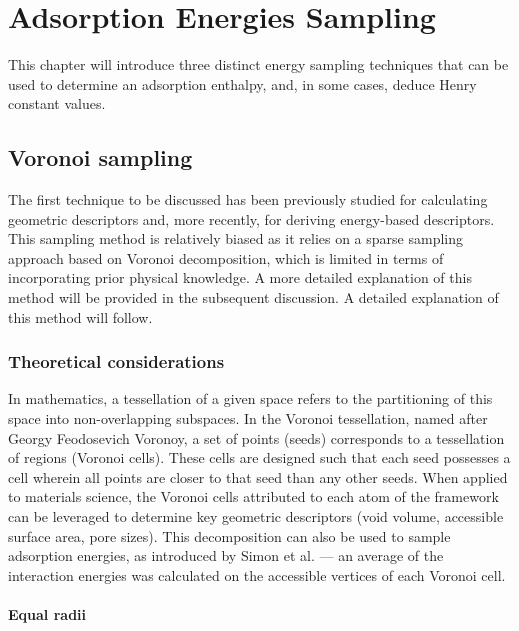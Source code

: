 \documentclass[main]{subfiles}
\begin{document}
\chapter{Adsorption Energies Sampling}
\vspace*{-1\baselineskip}

This chapter will introduce three distinct energy sampling techniques that can be used to determine an adsorption enthalpy, and, in some cases, deduce Henry constant values.

\section{Voronoi sampling}

The first technique to be discussed has been previously studied for calculating geometric descriptors and, more recently, for deriving energy-based descriptors\autocite{Simon_2015}. This sampling method is relatively biased as it relies on a sparse sampling approach based on Voronoi decomposition, which is limited in terms of incorporating prior physical knowledge. A more detailed explanation of this method will be provided in the subsequent discussion. A detailed explanation of this method will follow.

\subsection{Theoretical considerations}

In mathematics, a tessellation of a given space refers to the partitioning of this space into non-overlapping subspaces. In the Voronoi tessellation, named after Georgy Feodosevich Voronoy, a set of points (seeds) corresponds to a tessellation of regions (Voronoi cells). These cells are designed such that each seed possesses a cell wherein all points are closer to that seed than any other seeds.\autocite{Rycroft_2009} When applied to materials science, the Voronoi cells attributed to each atom of the framework can be leveraged to determine key geometric descriptors (void volume, accessible surface area, pore sizes). This decomposition can also be used to sample adsorption energies, as introduced by Simon et al. --- an average of the interaction energies was calculated on the accessible vertices of each Voronoi cell.\autocite{Simon_2015}

\subsubsection{Equal radii}
\end{document}
